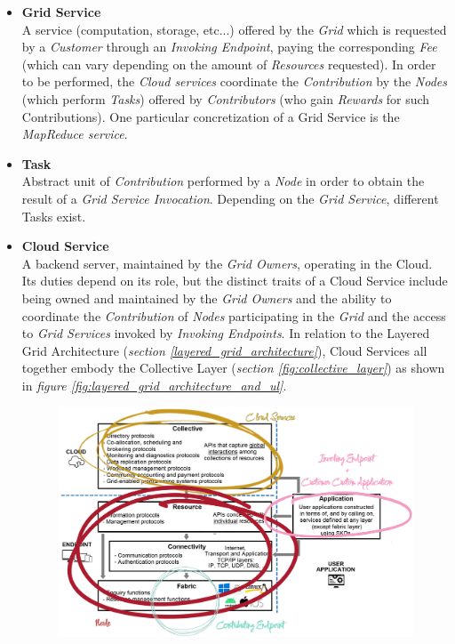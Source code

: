 \begin{itemize}
    \item \textbf{Grid Service}\label{grid_service}\\
    A service (computation, storage, etc...) offered by the \textit{Grid} which is requested by a \textit{Customer} through an \textit{Invoking Endpoint}, paying the corresponding \textit{Fee} (which can vary depending on the amount of \textit{Resources} requested). In order to be performed, the \textit{Cloud services} coordinate the \textit{Contribution} by the \textit{Nodes} (which perform \textit{Tasks}) offered by \textit{Contributors} (who gain \textit{Rewards} for such Contributions). One particular concretization of a Grid Service is the \textit{MapReduce service}.
    \item \textbf{Task}\label{task}\\
    Abstract unit of \textit{Contribution} performed by a \textit{Node} in order to obtain the result of a \textit{Grid Service Invocation}. Depending on the \textit{Grid Service}, different Tasks exist.
    \item \textbf{Cloud Service}\label{cloud_service}\\
    A backend server, maintained by the \textit{Grid Owners}, operating in the Cloud. Its duties depend on its role, but the distinct traits of a Cloud Service include being owned and maintained by the \textit{Grid Owners} and the ability to coordinate the \textit{Contribution} of \textit{Nodes} participating in the \textit{Grid} and the access to \textit{Grid Services} invoked by \textit{Invoking Endpoints}. In relation to the Layered Grid Architecture (\textit{section \ref{layered_grid_architecture}}), Cloud Services all together embody the Collective Layer (\textit{section \ref{fig:collective_layer}}) as shown in \textit{figure \ref{fig:layered_grid_architecture_and_ul}}.
    \begin{figure}[!ht]
        \centering
        \includegraphics[scale=0.18]{document/chapters/chapter_4/images/layered_grid_architecture_and_ul.png}

\end{figure}
\end{itemize}
